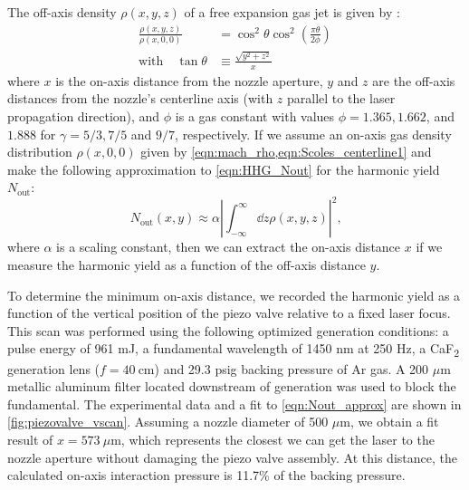 The off-axis density $\rho(x,y,z)$ of a free expansion gas jet is given by \cite{millerFreeJetSources1988}:
\begin{align}
\frac{\rho(x,y,z)}{\rho(x,0,0)} &= \cos^2 \theta \cos^2 \left( \frac{\pi \theta}{2 \phi} \right) \\
\textrm{with} \quad \tan \theta &\equiv \frac{\sqrt{y^2+z^2}}{x}
\label{eqn:off-axis-density}
\end{align}
where $x$ is the on-axis distance from the nozzle aperture, $y$ and $z$ are the off-axis distances from the nozzle's centerline axis (with $z$ parallel to the laser propagation direction), and $\phi$ is a gas constant with values ${\phi = 1.365, 1.662}$, and $1.888$ for ${\gamma = 5/3, 7/5}$ and $9/7$, respectively. If we assume an on-axis gas density distribution $\rho(x,0,0)$ given by \cref{eqn:mach_rho,eqn:Scoles_centerline1} and make the following approximation to \cref{eqn:HHG_Nout} for the harmonic yield $N_{\textrm{out}}$:
\begin{equation}
N_{\textrm{out}}(x, y) \approx \alpha \left| \int_{-\infty}^{\infty} \dd{z} \rho(x,y,z) \right|^2 \textrm{,}
\label{eqn:Nout_approx}
\end{equation}
where $\alpha$ is a scaling constant, then we can extract the on-axis distance $x$ if we measure the harmonic yield as a function of the off-axis distance $y$.

To determine the minimum on-axis distance, we recorded the harmonic yield as a function of the vertical position of the piezo valve relative to a fixed laser focus. This scan was performed using the following optimized generation conditions: a pulse energy of 961 mJ, a fundamental wavelength of 1450 nm at 250 Hz, a CaF\textsubscript{2} generation lens ($f = 40 \ \textrm{cm}$) and 29.3 psig backing pressure of Ar gas. A 200 $\mu$m metallic aluminum filter located downstream of generation was used to block the fundamental. The experimental data and a fit to \cref{eqn:Nout_approx} are shown in \cref{fig:piezovalve_vscan}. Assuming a nozzle diameter of 500 $\mu$m, we obtain a fit result of $x = 573 \ \mu\textrm{m}$, which represents the closest we can get the laser to the nozzle aperture without damaging the piezo valve assembly. At this distance, the calculated on-axis interaction pressure is 11.7\% of the backing pressure.

